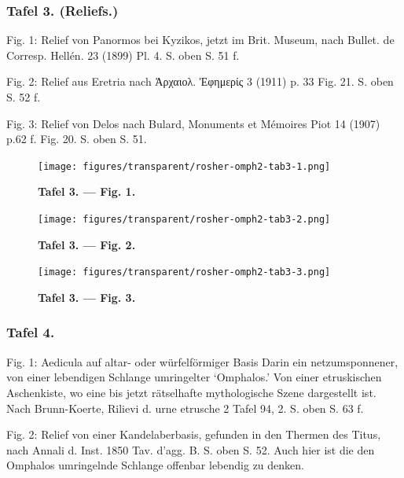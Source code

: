 \documentclass[a4paper, 11pt, oneside]{article}
\begin{document}
\subsubsection{Tafel 3. (Reliefs.)}

Fig. 1: Relief von Panormos bei Kyzikos, jetzt im Brit. Museum, nach Bullet. de Corresp. Hellén. 23 (1899) Pl. 4. S. oben S. 51 f.

Fig. 2: Relief aus Eretria nach Ἀρχαιολ. Ἐφημερίς 3 (1911) p. 33 Fig. 21. S. oben S. 52 f.

Fig. 3: Relief von Delos nach Bulard, Monuments et Mémoires Piot 14 (1907) p.62 f. Fig. 20. S. oben S. 51.
\clearpage
\begin{landscape}
\vspace*{\fill}
\begin{figure}[H]
\centering
\texttt{[image: figures/transparent/rosher-omph2-tab3-1.png]}
\caption{\bfseries Tafel 3. --- Fig. 1.}
\end{figure}
\vspace*{\fill}
\clearpage
\vspace*{\fill}
\begin{figure}[H]
\centering
\texttt{[image: figures/transparent/rosher-omph2-tab3-2.png]}
\caption{\bfseries Tafel 3. --- Fig. 2.}
\end{figure}
\vspace*{\fill}
\clearpage
\vspace*{\fill}
\begin{figure}[H]
\centering
\texttt{[image: figures/transparent/rosher-omph2-tab3-3.png]}
\caption{\bfseries Tafel 3. --- Fig. 3.}
\end{figure}
\vspace*{\fill}
\clearpage
\end{landscape}
\subsubsection{Tafel 4.}

Fig. 1: Aedicula auf altar- oder würfelförmiger Basis Darin ein netzumsponnener, von einer lebendigen Schlange umringelter `Omphalos.' Von einer etruskischen Aschenkiste, wo eine bis jetzt rätselhafte mythologische Szene dargestellt ist. Nach Brunn-Koerte, Rilievi d. urne etrusche 2 Tafel 94, 2. S. oben S. 63 f.

Fig. 2: Relief von einer Kandelaberbasis, gefunden in den Thermen des Titus, nach Annali d. Inst. 1850 Tav. d'agg. B. S. oben S. 52. Auch hier ist die den Omphalos umringelnde Schlange offenbar lebendig zu denken.
\end{document}
